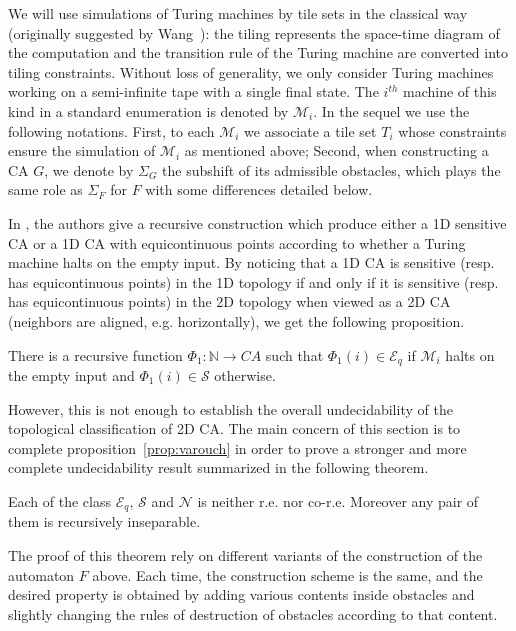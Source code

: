 \documentclass{llncs}
\newcommand{\N}{\mathbb{N}}
\newcommand{\acf}{F}
\newcommand{\obst}{\Sigma_{\acf}}
\newcommand{\equpt}{\mathcal{E}_q}
\newcommand{\sensi}{\mathcal{S}}
\newcommand{\nono}{\mathcal{N}}
\newcommand{\phivarouch}{\Phi_1}
\newcommand{\machine}[1]{\mathcal{M}_{#1}}
\newcommand{\obstacl}[1]{\Sigma_{#1}}
\newcommand{\tileset}[1]{T_{#1}}
\begin{document}
We will use simulations of Turing machines by tile sets in the
classical way (originally suggested by Wang~\cite{Wang}): the tiling
represents the space-time diagram of the computation and the
transition rule of the Turing machine are converted into tiling
constraints.  Without loss of generality, we only consider Turing
machines working on a semi-infinite tape with a single final state.
The $i^{th}$ machine of this kind in a standard enumeration is denoted
by $\machine{i}$.  In the sequel we use the following notations.
First, to each $\machine{i}$ we associate a tile set $\tileset{i}$
whose constraints ensure the simulation of $\machine{i}$ as mentioned
above; Second, when constructing a CA $G$, we denote by
$\obstacl{G}$ the subshift of its admissible obstacles, which plays
the same role as $\obst$ for $\acf$ with some differences detailed
below.

In \cite{varouch}, the authors give a recursive construction which
produce either a 1D sensitive CA or a 1D CA with equicontinuous points
according to whether a Turing machine halts on the empty input. By
noticing that a 1D CA is sensitive (resp. has equicontinuous points)
in the 1D topology if and only if it is sensitive (resp. has
equicontinuous points) in the 2D topology when viewed as a 2D CA
(neighbors are aligned, e.g. horizontally), we get the following
proposition.

\begin{proposition}
  \label{prop:varouch}
  There is a recursive function ${\phivarouch : \N\rightarrow CA}$
  such that ${\phivarouch(i)\in\equpt}$ if $\machine{i}$ halts on the
  empty input and ${\phivarouch(i)\in\sensi}$ otherwise.
\end{proposition}

However, this is not enough to establish the overall undecidability of
the topological classification of 2D CA. The main concern of this
section is to complete proposition~\ref{prop:varouch} in order to
prove a stronger and more complete undecidability result summarized in
the following theorem.

\begin{theorem}
  \label{theo:undeci}
  Each of the class $\equpt$, $\sensi$ and $\nono$ is neither r.e. nor
  co-r.e.  Moreover any pair of them is recursively inseparable.
\end{theorem}

The proof of this theorem rely on different variants of the
construction of the automaton $\acf$ above. Each time, the construction
scheme is the same, and the desired property is obtained by adding
various contents inside obstacles and slightly changing the rules of
destruction of obstacles according to that content.
\end{document}
